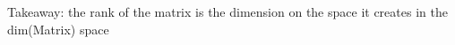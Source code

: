 \documentclass[preview]{standalone}
\begin{document}
\begin{center}
Takeaway: the rank of the matrix is the dimension on the space it creates in the dim(Matrix) space
\end{center}
\end{document}
